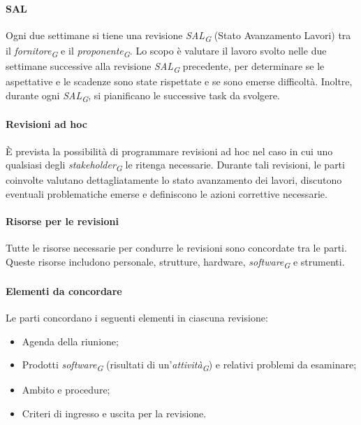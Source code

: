 \paragraph{SAL}
Ogni due settimane si tiene una revisione \textit{SAL}\textsubscript{\textit{G}} (Stato Avanzamento Lavori) tra il \textit{fornitore}\textsubscript{\textit{G}} e il \textit{proponente}\textsubscript{\textit{G}}. Lo scopo è valutare il lavoro svolto nelle due settimane successive alla revisione \textit{SAL}\textsubscript{\textit{G}} precedente, per determinare se le aspettative e le scadenze sono state rispettate e se sono emerse difficoltà. Inoltre, durante ogni \textit{SAL}\textsubscript{\textit{G}}, si pianificano le successive task da svolgere.

\paragraph{Revisioni ad hoc}
È prevista la possibilità di programmare revisioni ad hoc nel caso in cui uno qualsiasi degli \textit{stakeholder}\textsubscript{\textit{G}} le ritenga necessarie.
Durante tali revisioni, le parti coinvolte valutano dettagliatamente lo stato avanzamento dei lavori, discutono eventuali problematiche emerse e definiscono le azioni correttive necessarie.

\paragraph{Risorse per le revisioni}
Tutte le risorse necessarie per condurre le revisioni sono concordate tra le parti. Queste risorse includono personale, strutture, hardware, \textit{software}\textsubscript{\textit{G}} e strumenti.

\paragraph{Elementi da concordare}
Le parti concordano i seguenti elementi in ciascuna revisione: 
\begin{itemize}
    \item Agenda della riunione;
    \item Prodotti \textit{software}\textsubscript{\textit{G}} (risultati di un'\textit{attività}\textsubscript{\textit{G}}) e relativi problemi da esaminare;
    \item Ambito e procedure;
    \item Criteri di ingresso e uscita per la revisione.
\end{itemize}

